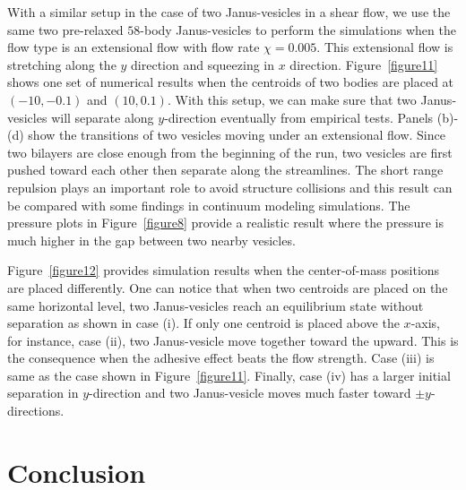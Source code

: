 \documentclass[lineno]{jfm}
\begin{document}
With a similar setup in the case of two Janus-vesicles in a shear flow, we use the same two pre-relaxed $58$-body Janus-vesicles to perform the simulations when the flow type is an extensional flow with flow rate $\chi=0.005$. This extensional flow is stretching along the $y$ direction and squeezing in $x$ direction.
Figure~\ref{figure11} shows one set of numerical results when the centroids of two bodies are placed at
$(-10,-0.1)$ and $(10,0.1)$. With this setup, we can make sure that two Janus-vesicles will separate along 
$y$-direction eventually from empirical tests. Panels (b)-(d) show the transitions of two vesicles moving under an extensional flow.  Since two bilayers are close enough from the beginning of the run, two vesicles are first pushed toward each other then separate along the streamlines. The short range repulsion plays an important role to avoid structure collisions and this result can be compared with some findings in continuum modeling simulations. The pressure plots in Figure~\ref{figure8} provide a realistic result where the pressure is much higher in the gap between two nearby vesicles. 

Figure~\ref{figure12} provides simulation results when the center-of-mass positions are placed differently.
One can notice that when two centroids are placed on the same horizontal level, two Janus-vesicles reach
an equilibrium state without separation as shown in case (i). If only one centroid is placed above the $x$-axis, for instance, case (ii), two Janus-vesicle move together toward the upward. This is the consequence when the adhesive effect beats the flow strength. Case (iii) is same as the case shown in Figure~\ref{figure11}. Finally, case (iv) has a larger initial separation in $y$-direction and two Janus-vesicle moves much faster toward 
$\pm y$-directions.






\section{\label{conclusion}Conclusion}


\begin{acknowledgments}
\end{acknowledgments}
\end{document}
